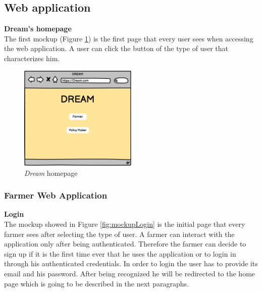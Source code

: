 \subsection{Web application}
\textbf{Dream's homepage} \\
The first mockup (Figure \ref{fig:dream}) is the first page that every user sees when accessing the web application. 
A user can click the button of the type of user that characterizes him.
\begin{figure}[H]
    \begin{center}
    \includegraphics[width=0.5\textwidth]{images/mockups/Dream.png}
    \caption{\emph{Dream} homepage}
    \label{fig:dream}
    \end{center}
\end{figure}


\subsubsection{Farmer Web Application}
\textbf{Login}\\ 
The mockup showed in Figure \ref{fig:mockupLogin} is the initial page that every farmer sees after selecting the type of user. A farmer can interact with the application only 
after being authenticated. Therefore the farmer can decide to sign up if it is the first time ever that he uses the application or to login in through his authenticated credentials.
In order to login the user has to provide its email and his password. After being recognized he will be redirected to the home page which is going to be described in the next paragraphs.

